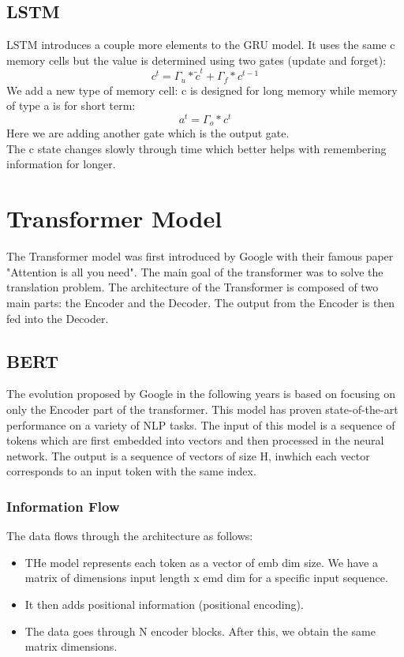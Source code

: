 \documentclass{article}
\begin{document}
\subsection*{LSTM}
LSTM introduces a couple more elements to the GRU model. It uses the same c memory cells but the value is determined using two gates (update and forget):
\[ 
    c^t =\Gamma_u * \tilde{c}^t + \Gamma_f * c^{t-1}
\]
We add a new type of memory cell: c is designed for long memory while memory of type a is for short term:
\[ 
    a^t = \Gamma_o * c^t 
\]Here we are adding another gate which is the output gate.\\ The c state changes slowly through time which better helps with remembering information for longer.

\section{Transformer Model}
The Transformer model was first introduced by Google with their famous paper "Attention is all you need". The main goal of the transformer was to solve the translation problem. The architecture of the Transformer is composed of two main parts: the Encoder and the Decoder. The output from the Encoder is then fed into the Decoder.
\subsection*{BERT}
The evolution proposed by Google in the following years is based on focusing on only the Encoder part of the transformer. This model has proven state-of-the-art performance on a variety of NLP tasks. The input of this model is a sequence of tokens which are first embedded into vectors and then processed in the neural network. The output is a sequence of vectors of size H, inwhich each vector corresponds to an input token with the same index. 
\subsubsection*{Information Flow}
The data flows through the architecture as follows:
\begin{itemize}
    \item THe model represents each token as a vector of emb dim size. We have a matrix of dimensions input length x emd dim for a specific input sequence.
    \item It then adds positional information (positional encoding).
    \item The data goes through N encoder blocks. After this, we obtain the same matrix dimensions. 
\end{itemize}
\end{document}
